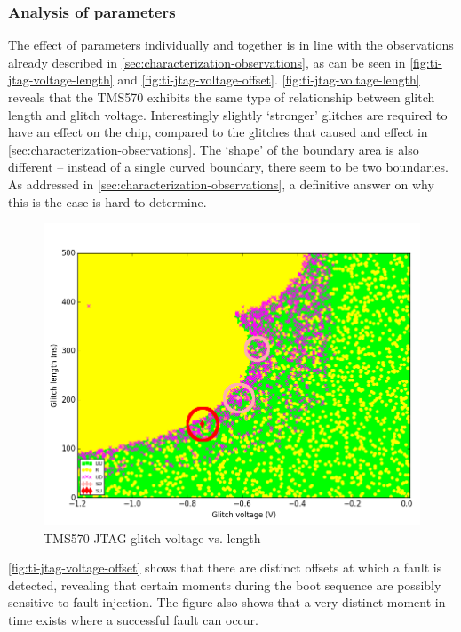 \documentclass[10pt]{article}
\newcommand{\TI}{TMS570\xspace}
\newcommand{\jtag}{JTAG\xspace}
\begin{document}
  \subsubsection{Analysis of parameters}

    The effect of parameters individually and together is in line with the observations already described in \autoref{sec:characterization-observations}, as can be seen in \autoref{fig:ti-jtag-voltage-length} and \autoref{fig:ti-jtag-voltage-offset}. \autoref{fig:ti-jtag-voltage-length} reveals that the \TI exhibits the same type of relationship between glitch length and glitch voltage. Interestingly slightly `stronger' glitches are required to have an effect on the chip, compared to the glitches that caused and effect in \autoref{sec:characterization-observations}. The `shape' of the boundary area is also different -- instead of a single curved boundary, there seem to be two boundaries. As addressed in \autoref{sec:characterization-observations}, a definitive answer on why this is the case is hard to determine. 

    \begin{figure}[H]
      \centering
      \includegraphics[width=\textwidth]{../plots/newplots/ti-jtag-voltage-length.png}
      \caption{\TI \jtag glitch voltage vs. length}
      \label{fig:ti-jtag-voltage-length}
    \end{figure}

    \autoref{fig:ti-jtag-voltage-offset} shows that there are distinct offsets at which a fault is detected, revealing that certain moments during the boot sequence are possibly sensitive to fault injection. The figure also shows that a very distinct moment in time exists where a successful fault can occur. 
\end{document}
